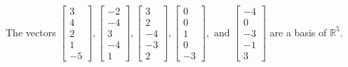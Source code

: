 \begin{exercise}
\begin{exerciseStatement}
  \end{exerciseStatement}
  \begin{exerciseAnswer}
   The vectors \(\left[\begin{array}{r}
3 \\
4 \\
2 \\
1 \\
-5
\end{array}\right] , \left[\begin{array}{r}
-2 \\
-4 \\
3 \\
-4 \\
1
\end{array}\right] , \left[\begin{array}{r}
3 \\
2 \\
-4 \\
-3 \\
2
\end{array}\right] , \left[\begin{array}{r}
0 \\
0 \\
1 \\
0 \\
-3
\end{array}\right] , \text{ and } \left[\begin{array}{r}
-4 \\
0 \\
-3 \\
-1 \\
3
\end{array}\right]\) 
  	 are  a basis of \(\mathbb{R}^5\).
  


  \end{exerciseAnswer}
\end{exercise}